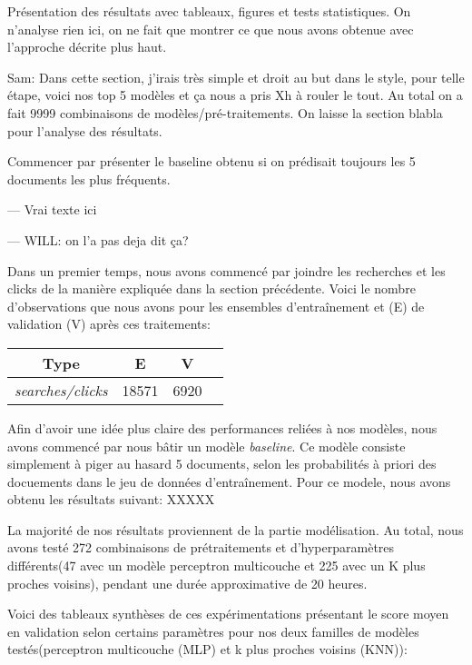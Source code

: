 Présentation des résultats avec tableaux, figures et tests statistiques.
On n'analyse rien ici, on ne fait que montrer ce que nous avons obtenue avec l'approche décrite plus haut.

Sam: Dans cette section, j'irais très simple et droit au but dans le style, pour telle étape, voici nos top 5 modèles et ça nous a pris Xh à rouler le tout.
Au total on a fait 9999 combinaisons de modèles/pré-traitements.
On laisse la section blabla pour l'analyse des résultats.

Commencer par présenter le baseline obtenu si on prédisait toujours les 5 documents les plus fréquents.

--- Vrai texte ici

--- WILL: on l'a pas deja dit ça?

Dans un premier temps, nous avons commencé par joindre les recherches et les clicks de la manière expliquée dans la section précédente. Voici le nombre d'observations que nous avons pour les ensembles d'entraînement et (E) de validation (V) après ces traitements:

\begin{center}
  \begin{tabular}{ |c|c|c|c| } 
     \hline
     Type & E & V \\
     \hline
     \hline
     \textit{searches/clicks} & 18571 & 6920 \\ 
     \hline
  \end{tabular}
\end{center}

Afin d'avoir une idée plus claire des performances reliées à nos modèles, nous avons commencé par nous bâtir un modèle \textit{baseline}. Ce modèle consiste simplement à piger au hasard 5 documents, selon les probabilités à priori des docuements dans le jeu de données d'entraînement. Pour ce modele, nous avons obtenu les résultats suivant: XXXXX



La majorité de nos résultats proviennent de la partie modélisation. Au total, nous avons testé 272 combinaisons de prétraitements et d'hyperparamètres différents(47 avec un modèle perceptron multicouche et 225 avec un K plus proches voisins), pendant une durée approximative de 20 heures. 
\break

Voici des tableaux synthèses de ces expérimentations présentant le score moyen en validation selon certains paramètres pour nos deux familles de modèles testés(perceptron multicouche (MLP) et k plus proches voisins (KNN)):

